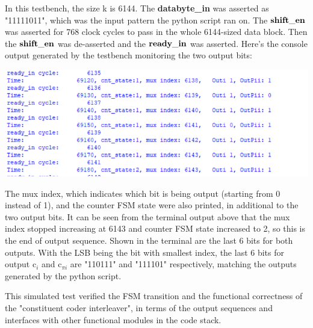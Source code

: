 \documentclass[letterpaper, 12pt]{article} %
\begin{document}
In this testbench, the size k is 6144. The {\bf databyte\_in} was asserted as "11111011", which was the input pattern the python script ran on. The ${\bf  shift\_en}$ was asserted for 768 clock cycles to pass in the whole 6144-sized data block. Then the  ${\bf  shift\_en}$ was de-asserted and the ${\bf  ready\_in}$ was asserted. Here's the console output generated by the testbench monitoring the two output bits:
\begin{center}
\includegraphics[width=14cm, angle=0]{files/modelsim_result}
\end{center}

The mux index, which indicates which bit is being output (starting from 0 instead of 1), and the counter FSM state were also printed, in additional to the two output bits. It can be seen from the terminal output above that the mux index stopped increasing at 6143 and counter FSM state increased to 2, so this is the end of output sequence. Shown in the terminal are the last 6 bits for both outputs. With the LSB being the bit with smallest index, the last 6 bits for output c$_{i}$ and c$_{\pi i}$ are "110111" and "111101" respectively, matching the outputs generated by the python script.\par
This simulated test verified the FSM transition and the functional correctness of the "constituent coder interleaver", in terms of the output sequences and interfaces with other functional modules in the code stack.
\end{document}
